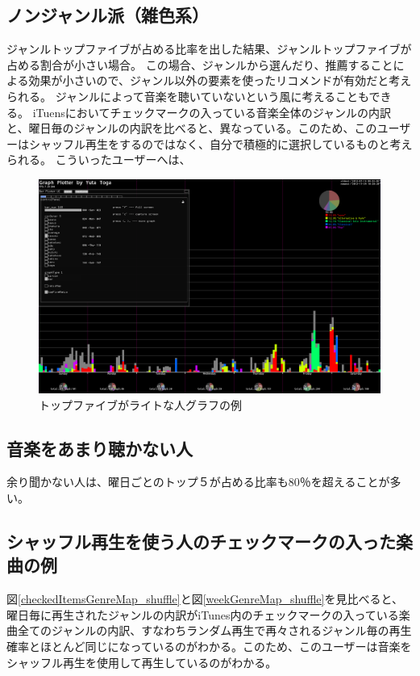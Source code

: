 \documentclass{jsarticle}
\begin{document}
\subsection{ノンジャンル派（雑色系）}
ジャンルトップファイブが占める比率を出した結果、ジャンルトップファイブが占める割合が小さい場合。
この場合、ジャンルから選んだり、推薦することによる効果が小さいので、ジャンル以外の要素を使ったリコメンドが有効だと考えられる。
ジャンルによって音楽を聴いていないという風に考えることもできる。
iTuensにおいてチェックマークの入っている音楽全体のジャンルの内訳と、曜日毎のジャンルの内訳を比べると、異なっている。このため、このユーザーはシャッフル再生をするのではなく、自分で積極的に選択しているものと考えられる。
こういったユーザーへは、

\begin{figure}[h]
\begin{center}
\includegraphics[width=14cm]{topFive_light.png}
\caption{トップファイブがライトな人グラフの例}
\label{topFive_heavy}
\end{center}
\end{figure}

\subsection{音楽をあまり聴かない人}
余り聞かない人は、曜日ごとのトップ５が占める比率も80％を超えることが多い。

\subsection{シャッフル再生を使う人のチェックマークの入った楽曲の例}
図\ref{checkedItemsGenreMap_shuffle}と図\ref{weekGenreMap_shuffle}を見比べると、曜日毎に再生されたジャンルの内訳がiTunes内のチェックマークの入っている楽曲全てのジャンルの内訳、すなわちランダム再生で再々されるジャンル毎の再生確率とほとんど同じになっているのがわかる。このため、このユーザーは音楽をシャッフル再生を使用して再生しているのがわかる。
\end{document}
